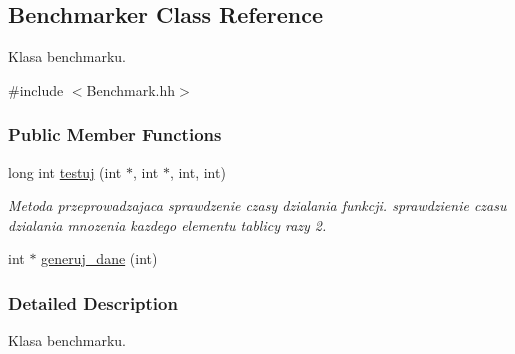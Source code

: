 \hypertarget{a00001}{\subsection{Benchmarker Class Reference}
\label{a00001}
}


Klasa benchmarku.  




{\ttfamily \#include $<$Benchmark.\-hh$>$}

\subsubsection*{Public Member Functions}
\begin{DoxyCompactItemize}
\item 
long int \hyperlink{a00001_a052e2f1a6eabd447f6ffd57b6cc49f80}{testuj} (int $\ast$, int $\ast$, int, int)
\begin{DoxyCompactList}\small\item\em Metoda przeprowadzajaca sprawdzenie czasy dzialania funkcji. sprawdzienie czasu dzialania mnozenia kazdego elementu tablicy razy 2. \end{DoxyCompactList}\item 
int $\ast$ \hyperlink{a00001_a917b8efeea3b8a82882be68e490548e8}{generuj\-\_\-dane} (int)
\end{DoxyCompactItemize}


\subsubsection{Detailed Description}
Klasa benchmarku. 

